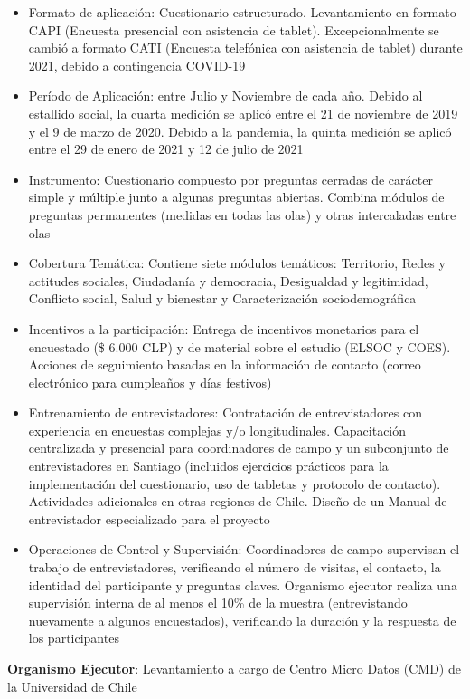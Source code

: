\documentclass[
  12pt,
]{book}
\begin{document}
\begin{itemize}
\item
  Formato de aplicación: Cuestionario estructurado. Levantamiento en formato CAPI (Encuesta presencial con asistencia de tablet). Excepcionalmente se cambió a formato CATI (Encuesta telefónica con asistencia de tablet) durante 2021, debido a contingencia COVID-19
\item
  Período de Aplicación: entre Julio y Noviembre de cada año. Debido al estallido social, la cuarta medición se aplicó entre el 21 de noviembre de 2019 y el 9 de marzo de 2020. Debido a la pandemia, la quinta medición se aplicó entre el 29 de enero de 2021 y 12 de julio de 2021
\item
  Instrumento: Cuestionario compuesto por preguntas cerradas de carácter simple y múltiple junto a algunas preguntas abiertas. Combina módulos de preguntas permanentes (medidas en todas las olas) y otras intercaladas entre olas
\item
  Cobertura Temática: Contiene siete módulos temáticos: Territorio, Redes y actitudes sociales, Ciudadanía y democracia, Desigualdad y legitimidad, Conflicto social, Salud y bienestar y Caracterización sociodemográfica
\item
  Incentivos a la participación: Entrega de incentivos monetarios para el encuestado (\$ 6.000 CLP) y de material sobre el estudio (ELSOC y COES). Acciones de seguimiento basadas en la información de contacto (correo electrónico para cumpleaños y días festivos)
\item
  Entrenamiento de entrevistadores: Contratación de entrevistadores con experiencia en encuestas complejas y/o longitudinales. Capacitación centralizada y presencial para coordinadores de campo y un subconjunto de entrevistadores en Santiago (incluidos ejercicios prácticos para la implementación del cuestionario, uso de tabletas y protocolo de contacto). Actividades adicionales en otras regiones de Chile. Diseño de un Manual de entrevistador especializado para el proyecto
\item
  Operaciones de Control y Supervisión: Coordinadores de campo supervisan el trabajo de entrevistadores, verificando el número de visitas, el contacto, la identidad del participante y preguntas claves. Organismo ejecutor realiza una supervisión interna de al menos el 10\% de la muestra (entrevistando nuevamente a algunos encuestados), verificando la duración y la respuesta de los participantes
\end{itemize}

\textbf{Organismo Ejecutor}: Levantamiento a cargo de Centro Micro Datos (CMD) de la Universidad de Chile
\end{document}
